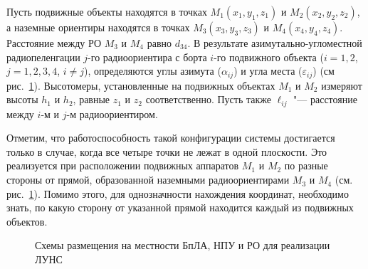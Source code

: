 \documentclass[../main.tex]{subfiles}
\begin{document}
Пусть подвижные объекты находятся в точках $M_1\left(x_1, y_1, z_1\right)$ и $M_2\left(x_2, y_2, z_2\right)$, а наземные ориентиры находятся в точках $M_3\left(x_3, y_3, z_3\right)$ и $M_4\left(x_4, y_4, z_4\right)$. Расстояние между РО $M_3$ и $M_4$ равно $d_{34}$. В результате азимутально-угломестной радиопеленгации  $j$-го радиоориентира с борта $i$-го подвижного объекта ($i = 1,2$, $j=1,2,3,4$, $i \ne j$), определяются углы азимута ($\alpha_{ij}$) и угла места ($\varepsilon_{ij}$) (см рис.~\ref{fig:systems:pic2}). Высотомеры, установленные на подвижных объектах $M_1$ и $M_2$ измеряют высоты $h_1$ и $h_2$, равные $z_1$ и $z_2$ соответственно. Пусть также $\ell_{ij}$ "--- расстояние между $i$-м и $j$-м радиоориентиром.

Отметим, что работоспособность такой конфигурации системы достигается только в случае, когда все четыре точки не лежат в одной плоскости. Это реализуется при расположении подвижных аппаратов $M_1$ и $M_2$ по разные стороны от прямой, образованной наземными радиоориентирами $M_3$ и $M_4$ (см. рис.~\ref{fig:systems:pic2}). Помимо этого, для однозначности нахождения координат, необходимо знать, по какую сторону от указанной прямой находится каждый из подвижных объектов.

\begin{figure}[htbp]
    \begin{center}


    \caption{Схемы размещения на местности БпЛА, НПУ и РО для реализации ЛУНС}
    \label{fig:systems:pic2}
    \end{center}
\end{figure}
\end{document}
